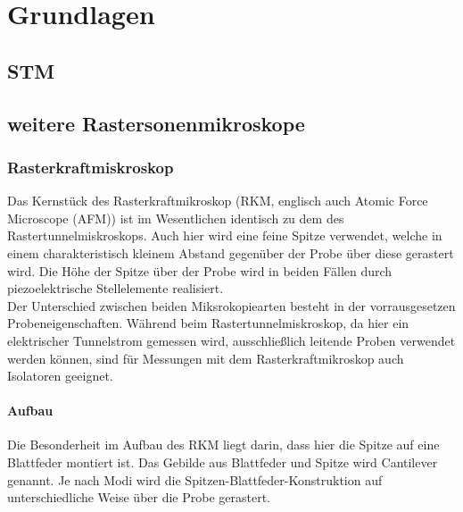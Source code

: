 \documentclass[a4paper,twoside,final]{article}
\begin{document}
\section{Grundlagen} \label{sec:Grundlagen}
\subsection{STM}
\subsection{weitere Rastersonenmikroskope}
\subsubsection{Rasterkraftmiskroskop}
Das Kernstück des Rasterkraftmikroskop (RKM, englisch auch Atomic Force Microscope (AFM)) ist im Wesentlichen identisch zu dem des Rastertunnelmiskroskops. Auch hier wird eine feine Spitze verwendet, welche in einem charakteristisch kleinem Abstand gegenüber der Probe über diese gerastert wird. Die Höhe der Spitze über der Probe wird in beiden Fällen durch piezoelektrische Stellelemente realisiert. \\
Der Unterschied zwischen beiden Miksrokopiearten besteht in der vorrausgesetzen Probeneigenschaften. Während beim Rastertunnelmiskroskop, da hier ein elektrischer Tunnelstrom gemessen wird, ausschließlich leitende Proben verwendet werden können, sind für Messungen mit dem Rasterkraftmikroskop auch Isolatoren geeignet.\\
\paragraph{Aufbau}
Die Besonderheit im Aufbau des RKM liegt darin, dass hier die Spitze auf eine Blattfeder montiert ist. Das Gebilde aus Blattfeder und Spitze wird Cantilever genannt. Je nach Modi wird die Spitzen-Blattfeder-Konstruktion auf unterschiedliche Weise über die Probe gerastert.
\end{document}
